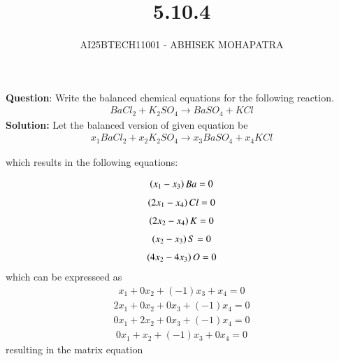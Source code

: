 \documentclass[journal,12pt,onecolumn]{IEEEtran}
\begin{document}
\title{5.10.4}
\author{AI25BTECH11001 - ABHISEK MOHAPATRA}
{\let\newpage\relax\maketitle}
	
	 	\textbf{Question}:
		Write the balanced chemical equations for the following reaction.
		\begin{align}
				BaCl_2+K_2SO_4 \rightarrow BaSO_4+KCl
		\end{align}
		\textbf{Solution:}
		Let the balanced version of given equation be
		\begin{align}
				x_1BaCl_2+x_2K_2SO_4 \rightarrow x_3BaSO_4+x_4KCl
		\end{align}

		which results in the following equations:


		\begin{align}
				\left(x_1-x_3\right)Ba = 0
		\end{align}
		\begin{align}
				\left(2x_1-x_4\right)Cl = 0
		\end{align}
		\begin{align}
				\left(2x_2-x_4\right)K = 0
		\end{align}
		\begin{align}
				\left(x_2-x_3\right)S = 0
		\end{align}
		\begin{align}
				\left(4x_2 - 4x_3\right)O = 0
		\end{align}
		which can be expresseed as
		\begin{align}
				x_1+ 0x_2 +(-1)x_3 +x_4= 0
		\end{align}
		\begin{align}
				2x_1+ 0x_2 +0x_3 +(-1)x_4= 0
		\end{align}
		\begin{align}
				0x_1+ 2x_2 +0x_3 +(-1)x_4= 0
		\end{align}
		\begin{align}
				0x_1+ x_2 +(-1)x_3 +0x_4= 0
		\end{align}
resulting in the matrix equation
\end{document}
